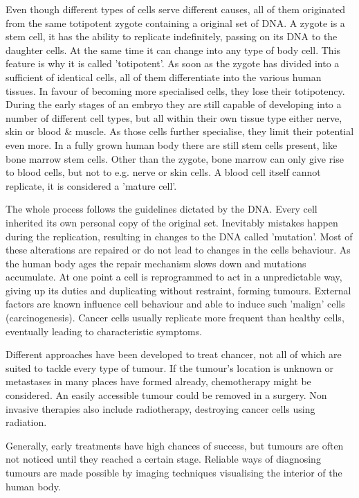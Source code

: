 Even though different types of cells serve different causes, all of them originated from the same totipotent zygote containing a original set of DNA.
A zygote is a stem cell, it has the ability to replicate indefinitely, passing on its DNA to the daughter cells.
At the same time it can change into any type of body cell. This feature is why it is called 'totipotent'.
As soon as the zygote has divided into a sufficient of identical cells, all of them differentiate into the various human tissues.
In favour of becoming more specialised cells, they lose their totipotency.
During the early stages of an embryo they are still capable of developing into a number of different cell types, but all within their own tissue type  either nerve, skin or blood \& muscle.
As those cells further specialise, they limit their potential even more.
In a fully grown human body there are still stem cells present, like bone marrow stem cells.
Other than the zygote, bone marrow can only give rise to blood cells, but not to e.g. nerve or skin cells.
A blood cell itself cannot replicate, it is considered a 'mature cell'.

The whole process follows the guidelines dictated by the DNA. Every cell inherited its own personal copy of the original set.
Inevitably mistakes happen during the replication, resulting in changes to the DNA called 'mutation'.
Most of these alterations are repaired or do not lead to changes in the cells behaviour.
As the human body ages the repair mechanism slows down and mutations accumulate.
At one point a cell is reprogrammed to act in a unpredictable way, giving up its duties and duplicating without restraint, forming tumours.
External factors are known influence cell behaviour and able to induce such 'malign' cells (carcinogenesis).
Cancer cells usually replicate more frequent than healthy cells, eventually leading to characteristic symptoms.

Different approaches have been developed to treat chancer, not all of which are suited to tackle every type of tumour.
If the tumour's location is unknown or metastases in many places have formed already, chemotherapy might be considered.
An easily accessible tumour could be removed in a surgery.
Non invasive therapies also include radiotherapy, destroying cancer cells using radiation.

Generally, early treatments have high chances of success, but tumours are often not noticed until they reached a certain stage. 
Reliable ways of diagnosing tumours are made possible by imaging techniques visualising the interior of the human body.  \cite{Baumann2017} 

